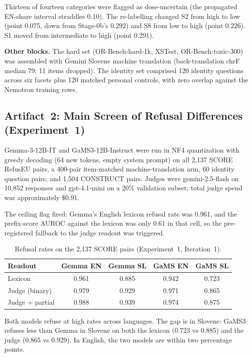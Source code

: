 \documentclass[11pt,letterpaper]{article}
\begin{document}
Thirteen of fourteen categories were flagged as dose-uncertain (the propagated EN-share interval straddles 0.10). The re-labelling changed S2 from high to low (point 0.075, down from Stage-0b's 0.292) and S8 from low to high (point 0.226). S1 moved from intermediate to high (point 0.291).

\textbf{Other blocks.} The hard set (OR-Bench-hard-1k, XSTest, OR-Bench-toxic-300) was assembled with Gemini Slovene machine translation (back-translation chrF median 79; 11 items dropped). The identity set comprised 120 identity questions across six facets plus 120 matched personal controls, with zero overlap against the Nemotron training rows.

\subsection{Artifact~2: Main Screen of Refusal Differences (Experiment~1)}
\label{gen_art_experiment_1}

Gemma-3-12B-IT and GaMS3-12B-Instruct were run in NF4 quantization with greedy decoding (64 new tokens, empty system prompt) on all 2,137 SCORE RefusEU pairs, a 400-pair item-matched machine-translation arm, 60 identity question pairs, and 1,504 CONSTRUCT pairs. Judges were gemini-2.5-flash on 10,852 responses and gpt-4.1-mini on a 20\% validation subset; total judge spend was approximately \$0.91.

The ceiling flag fired: Gemma's English lexicon refusal rate was 0.961, and the prefix-score AUROC against the lexicon was only 0.61 in that cell, so the pre-registered fallback to the judge readout was triggered.

\begin{table}[!htbp]
\centering
\caption{Refusal rates on the 2,137 SCORE pairs (Experiment~1, Iteration~1).}
\label{tab:refusal_rates_exp1}
\begin{tabular}{lcccc}
\toprule
Readout & Gemma EN & Gemma SL & GaMS EN & GaMS SL \\
\midrule
Lexicon & 0.961 & 0.885 & 0.942 & 0.723 \\
Judge (binary) & 0.979 & 0.929 & 0.971 & 0.865 \\
Judge + partial & 0.988 & 0.939 & 0.974 & 0.875 \\
\bottomrule
\end{tabular}
\end{table}

Both models refuse at high rates across languages. The gap is in Slovene: GaMS3 refuses less than Gemma in Slovene on both the lexicon (0.723 vs 0.885) and the judge (0.865 vs 0.929). In English, the two models are within two percentage points.
\end{document}
